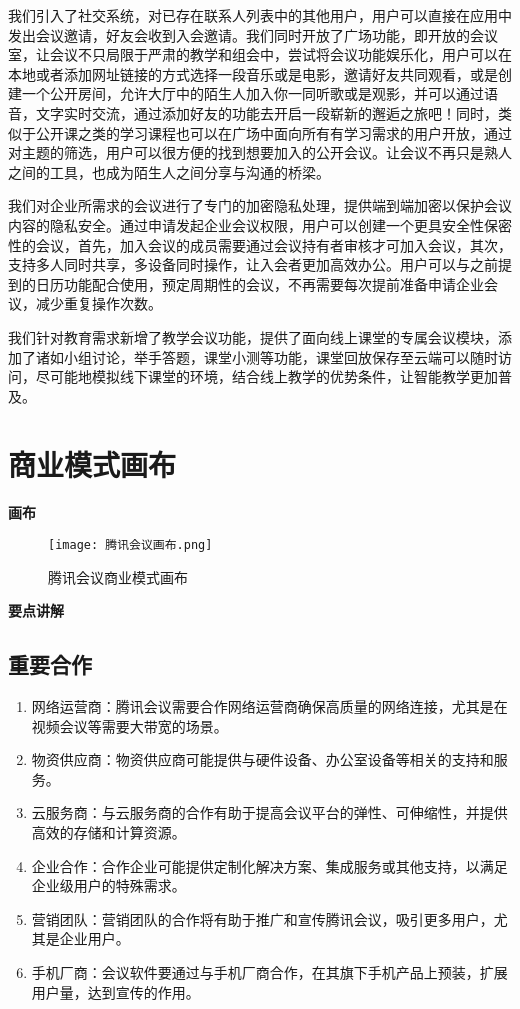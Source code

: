 \documentclass[a4paper,12pt]{article}
\begin{document}
    我们引入了社交系统，对已存在联系人列表中的其他用户，用户可以直接在应用中发出会议邀请，好友会收到入会邀请。我们同时开放了广场功能，即开放的会议室，让会议不只局限于严肃的教学和组会中，尝试将会议功能娱乐化，用户可以在本地或者添加网址链接的方式选择一段音乐或是电影，邀请好友共同观看，或是创建一个公开房间，允许大厅中的陌生人加入你一同听歌或是观影，并可以通过语音，文字实时交流，通过添加好友的功能去开启一段崭新的邂逅之旅吧！同时，类似于公开课之类的学习课程也可以在广场中面向所有有学习需求的用户开放，通过对主题的筛选，用户可以很方便的找到想要加入的公开会议。让会议不再只是熟人之间的工具，也成为陌生人之间分享与沟通的桥梁。

    我们对企业所需求的会议进行了专门的加密隐私处理，提供端到端加密以保护会议内容的隐私安全。通过申请发起企业会议权限，用户可以创建一个更具安全性保密性的会议，首先，加入会议的成员需要通过会议持有者审核才可加入会议，其次，支持多人同时共享，多设备同时操作，让入会者更加高效办公。用户可以与之前提到的日历功能配合使用，预定周期性的会议，不再需要每次提前准备申请企业会议，减少重复操作次数。

    我们针对教育需求新增了教学会议功能，提供了面向线上课堂的专属会议模块，添加了诸如小组讨论，举手答题，课堂小测等功能，课堂回放保存至云端可以随时访问，尽可能地模拟线下课堂的环境，结合线上教学的优势条件，让智能教学更加普及。


    \section{商业模式画布}
    \textbf{画布}\clearpage %
    \begin{figure}[H]
        \centering
        \texttt{[image: 腾讯会议画布.png]}
        \caption{腾讯会议商业模式画布}
        \label{figure}
    \end{figure}
    
    \textbf{要点讲解}
    \subsection{重要合作}
    \begin{enumerate}
        \item 网络运营商：腾讯会议需要合作网络运营商确保高质量的网络连接，尤其是在视频会议等需要大带宽的场景。
        \item 物资供应商：物资供应商可能提供与硬件设备、办公室设备等相关的支持和服务。
        \item 云服务商：与云服务商的合作有助于提高会议平台的弹性、可伸缩性，并提供高效的存储和计算资源。
        \item 企业合作：合作企业可能提供定制化解决方案、集成服务或其他支持，以满足企业级用户的特殊需求。
        \item 营销团队：营销团队的合作将有助于推广和宣传腾讯会议，吸引更多用户，尤其是企业用户。
        \item 手机厂商：会议软件要通过与手机厂商合作，在其旗下手机产品上预装，扩展用户量，达到宣传的作用。
    \end{enumerate}
\end{document}

